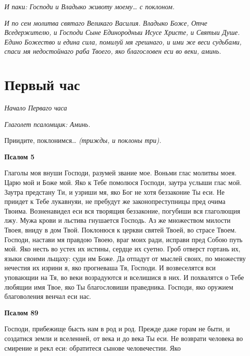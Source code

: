 \itshape И паки:\normalfont{} Господи и Владыко животу моему… \itshape с поклоном\normalfont{}.


 \itshape И по сем молитва святаго Великаго Василия.\normalfont{} Владыко Боже, Отче
Вседержителю, и Господи Сыне Единородныи Исусе Христе, и Святыи
Душе. Едино Божество и едина сила, помилуй мя грешнаго, и ими же веси
судьбами, спаси мя недостойнаго раба Твоего, яко благословен еси во веки,
аминь.

   


\section{Первый час}



\itshape Начало Перваго часа\normalfont{}


 \itshape Глаголет псаломщик:\normalfont{} Аминь.


   Приидите, поклонимся… \itshape (трижды, и поклоны три)\normalfont{}.






 

\bfseries Псалом 5\normalfont{}


   Глаголы моя внуши Господи, разумей звание мое. Воньми глас молитвы
моея. Царю мой и Боже мой. Яко к Тебе помолюся Господи, заутра
услыши глас мой. Заутра предстану Ти, и узриши мя, яко Бог не хотя
беззаконие Ты еси. Не приидет к Тебе лукавнуяи, не пребудут же
законопреступницы пред очима Твоима. Возненавидел еси вся творящия
беззаконие, погубиши вся глаголющия лжу. Мужа крови и льстива
гнушается Господь. Аз же множеством милости Твоея, вниду в дом
Твой. Поклонюся к церкви святей Твоей, во страсе Твоем. Господи,
настави мя правдою Твоею, враг моих ради, исправи пред Собою путь
мой. Яко несть во устех их истины, сердце их суетно. Гроб отверст
гортань их, языки своими льщаху: суди им Боже. Да отпадут от
мыслей своих, по множеству нечестия их изрини я, яко прогневаша Тя,
Господи. И возвеселятся вси уповающии на Тя, во веки возрадуются и
вселишися в них. И похвалятся о Тебе любящии имя Твое, яко Ты
благословиши праведника. Господи, яко оружием благоволения венчал еси
нас.






 

\bfseries Псалом 89\normalfont{}


   Господи, прибежище бысть нам в род и род. Прежде даже горам не быти,
и создатися земли и вселенней, от века и до века Ты еси. Не возврати
человека во смирение и рекл еси: обратитеся сынове человечестии. Яко

